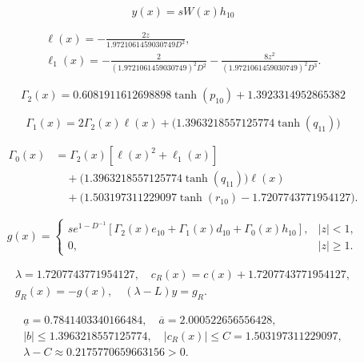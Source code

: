 \begin{equation}\label{eq:ex5-solution}
y(x)=sW(x)h_{10}
\end{equation}


\begin{equation}
\begin{aligned}\ell(x)=-\frac{2z}{1.9721061459030749D^2},\\\ell_1(x)=-\frac{2}{(1.9721061459030749)^2D^2}-\frac{8z^2}{(1.9721061459030749)^2D^3}.\end{aligned}
\end{equation}


\begin{equation}
\Gamma_2(x)=0.6081911612698898 \tanh{\left(p_{10} \right)} + 1.3923314952865382
\end{equation}


\begin{equation}
\Gamma_1(x)=2\Gamma_2(x)\ell(x)+\bigl(1.3963218557125774 \tanh{\left(q_{11} \right)}\bigr)
\end{equation}


\begin{equation}
\begin{aligned}\Gamma_0(x)&=\Gamma_2(x)[\ell(x)^2+\ell_1(x)]\\&\quad+\bigl(1.3963218557125774 \tanh{\left(q_{11} \right)}\bigr)\ell(x)\\&\quad+\bigl(1.503197311229097 \tanh{\left(r_{10} \right)} - 1.7207743771954127\bigr).\end{aligned}
\end{equation}


\begin{equation}\label{eq:ex5-forcing}
g(x)=\begin{cases}s e^{1-D^{-1}}[\Gamma_2(x)e_{10}+\Gamma_1(x)d_{10}+\Gamma_0(x)h_{10}],&|z|<1,\\0,&|z|\ge1.\end{cases}
\end{equation}


\begin{equation}
\begin{aligned}\lambda=1.7207743771954127,\quad c_R(x)=c(x)+1.7207743771954127,\\g_R(x)=-g(x),\quad (\lambda-L)y=g_R.\end{aligned}
\end{equation}


\begin{equation}
\begin{aligned}\underline a=0.7841403340166484,\quad \overline a=2.000522656556428,\\|b|\le1.3963218557125774,\quad |c_R(x)|\le C=1.503197311229097,\\\lambda-C\approx0.2175770659663156>0.\end{aligned}
\end{equation}


